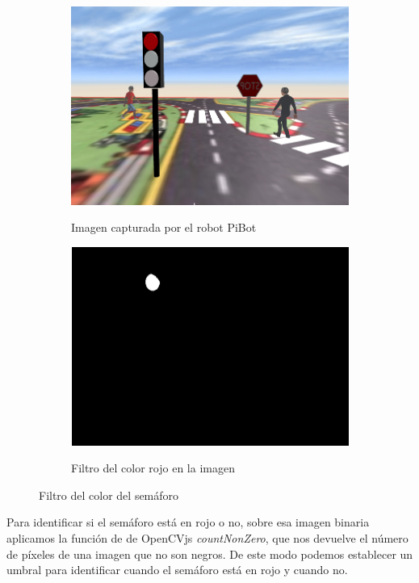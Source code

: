 \documentclass{report}
\begin{document}
\renewcommand{\figurename}{Figura}		
\begin{figure}[!h]
\centering
  \begin{subfigure}[b]{0.49\textwidth}
  \centering
    \includegraphics[scale=0.25]{images/cap4/rojo2.png}
    \label{fig:f1}
    \caption{Imagen capturada por el robot PiBot}
  \end{subfigure}
  \hfill
  \begin{subfigure}[b]{0.49\textwidth}
  \centering
    \includegraphics[scale=0.5]{images/cap4/rojo-filtrado.png}
    \label{fig:f2}
    \caption{Filtro del color rojo en la imagen}
  \end{subfigure}
  \caption{Filtro del color del semáforo}
\end{figure}

Para identificar si el semáforo está en rojo o no, sobre esa imagen binaria aplicamos la función de de OpenCVjs \textit{countNonZero}, que nos devuelve el número de píxeles de una imagen que no son negros. De este modo podemos establecer un umbral para identificar cuando el semáforo está en rojo y cuando no.
\end{document}

